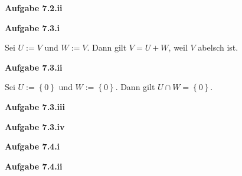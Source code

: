 \documentclass[12pt]{extarticle}
\begin{document}
\textbf{Aufgabe 7.2.ii}

\textbf{Aufgabe 7.3.i}

Sei \(U:=V\) und \(W:=V\).  Dann gilt \(V=U+W\), weil \(V\) abelsch ist.

\textbf{Aufgabe 7.3.ii}

Sei \(U:= \left\{ 0 \right\}\) und \(W:= \left\{ 0 \right\}\).  Dann gilt
\(U \cap W = \left\{ 0 \right\}\).

\textbf{Aufgabe 7.3.iii}

\textbf{Aufgabe 7.3.iv}

\textbf{Aufgabe 7.4.i}

\textbf{Aufgabe 7.4.ii}
\end{document}
